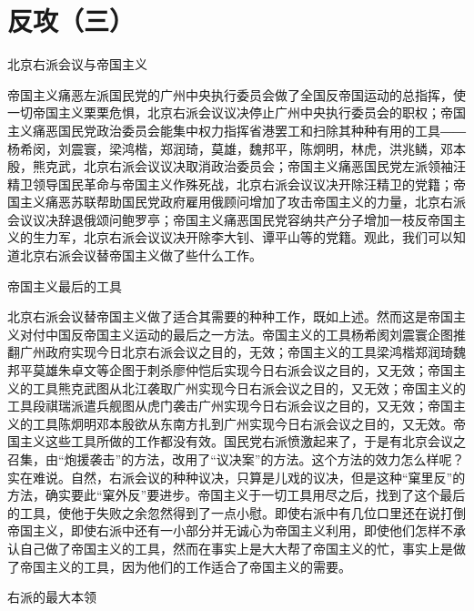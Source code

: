 \section[反攻（三）]{反攻（三）}


北京右派会议与帝国主义

帝国主义痛恶左派国民党的广州中央执行委员会做了全国反帝国运动的总指挥，使一切帝国主义栗栗危惧，北京右派会议议决停止广州中央执行委员会的职权；帝国主义痛恶国民党政治委员会能集中权力指挥省港罢工和扫除其种种有用的工具――杨希闵，刘震寰，梁鸿楷，郑润琦，莫雄，魏邦平，陈炯明，林虎，洪兆鳞，邓本殷，熊克武，北京右派会议议决取消政治委员会；帝国主义痛恶国民党左派领袖汪精卫领导国民革命与帝国主义作殊死战，北京右派会议议决开除汪精卫的党籍；帝国主义痛恶苏联帮助国民党政府雇用俄顾问增加了攻击帝国主义的力量，北京右派会议议决辞退俄颂问鲍罗亭；帝国主义痛恶国民党容纳共产分子增加一枝反帝国主义的生力军，北京右派会议议决开除李大钊、谭平山等的党籍。观此，我们可以知道北京右派会议替帝国主义做了些什么工作。

帝国主义最后的工具

北京右派会议替帝国主义做了适合其需要的种种工作，既如上述。然而这是帝国主义对付中国反帝国主义运动的最后之一方法。帝国主义的工具杨希阂刘震寰企图推翻广州政府实现今日北京右派会议之目的，无效；帝国主义的工具梁鸿楷郑润琦魏邦平莫雄朱卓文等企图于刺杀廖仲恺后实现今日右派会议之目的，又无效；帝国主义的工具熊克武图从北江袭取广州实现今日右派会议之目的，又无效；帝国主义的工具段祺瑞派遣兵舰图从虎门袭击广州实现今日右派会议之目的，又无效；帝国主义的工具陈炯明邓本殷欲从东南方扎到广州实现今日右派会议之目的，又无效。帝国主义这些工具所做的工作都没有效。国民党右派愤激起来了，于是有北京会议之召集，由“炮援袭击”的方法，改用了“议决案”的方法。这个方法的效力怎么样呢？实在难说。自然，右派会议的种种议决，只算是儿戏的议决，但是这种“窠里反”的方法，确实要此“窠外反”要进步。帝国主义于一切工具用尽之后，找到了这个最后的工具，使他于失败之余忽然得到了一点小慰。即使右派中有几位口里还在说打倒帝国主义，即使右派中还有一小部分并无诚心为帝国主义利用，即使他们怎样不承认自己做了帝国主义的工具，然而在事实上是大大帮了帝国主义的忙，事实上是做了帝国主义的工具，因为他们的工作适合了帝国主义的需要。

右派的最大本领

